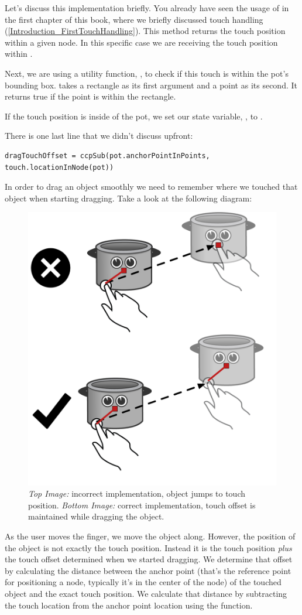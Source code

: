 Let's discuss this implementation briefly. You already have seen the usage of 
\linebreak {} in the first chapter of this
book, where we briefly discussed touch handling
(\ref{Introduction_FirstTouchHandling}). This method returns the touch position
within a given node. In this specific case we are receiving the touch position
within .

Next, we are using a utility function, , to
check if this touch is within the pot's bounding box.
 takes a rectangle as its first argument and a
point as its second. It returns true if the point is within the rectangle.

If the touch position is inside of the pot, we set our state variable,
, to . 

There is one last line that we didn't discuss upfront:
\begin{lstlisting}
dragTouchOffset = ccpSub(pot.anchorPointInPoints, touch.locationInNode(pot))
\end{lstlisting}

In order to drag an object smoothly we need to remember where we touched that
object when starting dragging. Take a look at the following diagram:
\begin{figure}[H]
		\centering
		\includegraphics[width=0.4\linewidth]{images/Chapter3/dragging_offset.png}
		\caption{\textit{Top Image:} incorrect implementation, object jumps to touch
		position. \textit{Bottom Image:} correct implementation, touch offset is
		maintained while dragging the object.}
		\label{user_interaction_touch_offset}
\end{figure}
As the user moves the finger, we move the object along. However, the position of
the object is not exactly the touch position. Instead it is the touch position
\textit{plus} the touch offset determined when we started dragging. We determine
that offset by calculating the distance between the anchor point (that's the
reference point for positioning a node, typically it's in the center of the
node) of the touched object and the exact touch position. We calculate that
distance by subtracting the touch location from the anchor point location using
the  function. 


